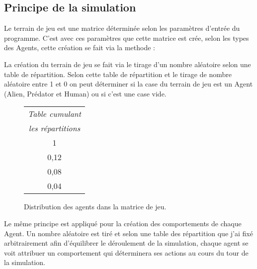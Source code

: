\subsection{Principe de la simulation}
Le terrain de jeu est une matrice déterminée selon les paramètres d'entrée du programme. C'est avec ces paramètres que cette matrice est crée, selon les types des Agents, cette création se fait via la methode :



La création du terrain de jeu se fait via le tirage d'un nombre aléatoire selon une table de répartition. Selon cette table de répartition et le tirage de nombre aléatoire entre 1 et 0 on peut déterminer si la case du terrain de jeu est un Agent (Alien, Prédator et Human) ou si c'est une case vide.
\begin{figure}[h]
\centering
\begin{multicols}{2}

\begin{tabular}{c}
  \textit{Table cumulant} \\
  \textit{les répartitions} \\
  \hline
  \hline
  1 \\
  0,12 \\
  0,08 \\
  0,04 \\ \hline
\end{tabular}

\end{multicols}
\caption{Distribution des agents dans la matrice de jeu.}
\end{figure}

\newpage
Le même principe est appliqué pour la création des comportements de chaque Agent. Un nombre aléatoire est tiré et selon une table des répartition que j'ai fixé arbitrairement afin d'équilibrer le déroulement de la simulation, chaque agent se voit attribuer un comportement qui déterminera ses actions au cours du tour de la simulation.


